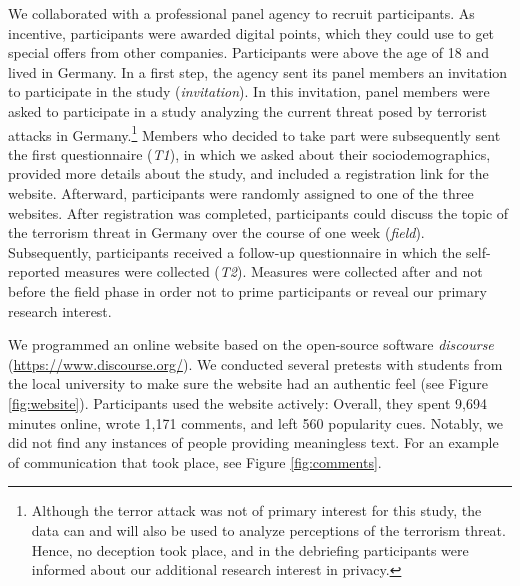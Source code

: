 \documentclass[
  english,
  man,floatsintext]{apa6}
\begin{document}
We collaborated with a professional panel agency to recruit participants.
As incentive, participants were awarded digital points, which they could use to get special offers from other companies.
Participants were above the age of 18 and lived in Germany.
In a first step, the agency sent its panel members an invitation to participate in the study (\emph{invitation}).
In this invitation, panel members were asked to participate in a study analyzing the current threat posed by terrorist attacks in Germany.\footnote{Although the terror attack was not of primary interest for this study, the data can and will also be used to analyze perceptions of the terrorism threat. Hence, no deception took place, and in the debriefing participants were informed about our additional research interest in privacy.}
Members who decided to take part were subsequently sent the first questionnaire (\emph{T1}), in which we asked about their sociodemographics, provided more details about the study, and included a registration link for the website.
Afterward, participants were randomly assigned to one of the three websites.
After registration was completed, participants could discuss the topic of the terrorism threat in Germany over the course of one week (\emph{field}).
Subsequently, participants received a follow-up questionnaire in which the self-reported measures were collected (\emph{T2}).
Measures were collected after and not before the field phase in order not to prime participants or reveal our primary research interest.

We programmed an online website based on the open-source software \emph{discourse} (\url{https://www.discourse.org/}).
We conducted several pretests with students from the local university to make sure the website had an authentic feel (see Figure \ref{fig:website}).
Participants used the website actively: Overall, they spent 9,694 minutes online, wrote 1,171 comments, and left 560 popularity cues.
Notably, we did not find any instances of people providing meaningless text.
For an example of communication that took place, see Figure \ref{fig:comments}.
\end{document}
